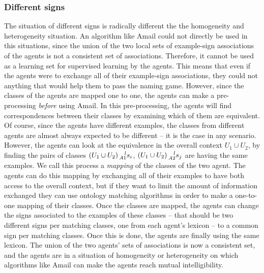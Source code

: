 \subsubsection{Different signs} The situation of different signs is radically different the the homogeneity and heterogeneity situation. An algorithm like Amail could not directly be used in this situations, since the union of the two local sets of example-sign associations of the agents is not a consistent set of associations. Therefore, it cannot be used as a learning set for supervised learning by the agents. This means that even if the agents were to exchange all of their example-sign associations, they could not anything that would help them to pass the naming game. However, since the classes of the agents are mapped one to one, the agents can make a pre-processing \emph{before} using Amail.
In this pre-processing, the agents will find correspondences between their classes by examining which of them are equivalent. Of course, since the agents have different examples, the classes from different agents are almost always expected to be different -- it is the case in any scenario. However, the agents can look at the equivalence in the overall context $U_{1} \cup U_{2}$, by finding the pairs of classes $(U_{1} \cup U_{2}) \prescript{l}{A1}{s_{i}}$, $(U_{1} \cup U_{2}) \prescript{l}{A2}{s_{j}}$ are having the same examples. We call this process a \emph{mapping} of the classes of the two agent. The agents can do this mapping by exchanging all of their examples to have both access to the overall context, but if they want to limit the amount of information exchanged they can use ontology matching algorithms in order to make a one-to-one mapping of their classes.
Once the classes are mapped, the agents can change the signs associated to the examples of these classes -- that should be two different signs per matching classes, one from each agent's lexicon -- to a common sign per matching classes. Once this is done, the agents are finally using the same lexicon. The union of the two agents' sets of associations is now a consistent set, and the agents are in a situation of homogeneity or heterogeneity on which algorithms like Amail can make the agents reach mutual intelligibility.

